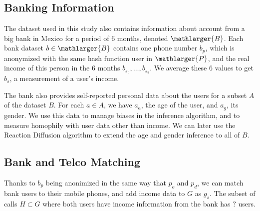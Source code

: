 \subsection{Banking Information}

The dataset used in this study also contains information about account from a big bank in Mexico for a period of 6 months, denoted \( \mathlarger{B} \). Each bank dataset \( b \in \mathlarger{B} \) contains one phone number \( b_p \), which is anonymized with the same hash function user in \( \mathlarger{P} \), and the real income of this person in the 6 months \( b_{s_0}, \ldots, b_{s_5} \). We average these 6 values to get \( b_s \), a measurement of a user's income.

The bank also provides self-reported personal data about the users for a subset \( A \) of the dataset \( B \). For each \( a \in A \), we have \( a_a \), the age of the user, and \( a_g \), its gender. We use this data to manage biases in the inference algorithm, and to measure homophily with user data other than income. We can later use the Reaction Diffusion algorithm \cite{brea2014} to extend the age and gender inference to all of \( B \).

\subsection{Bank and Telco Matching}

Thanks to \( b_p \) being anonimized in the same way that \( p_o \) and \( p_d \), we can match bank users to their mobile phones, and add income data to \( G \) as \( g_s \). The subset of calls \( H \subset G \) where both users have income information from the bank has \( ? \) users.
